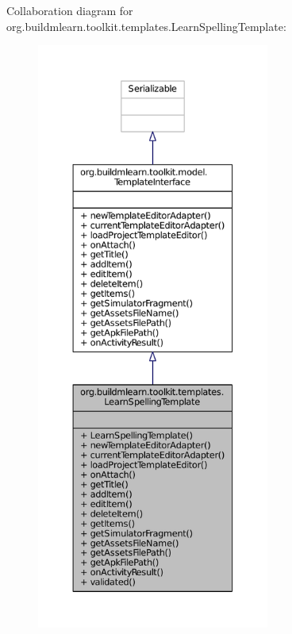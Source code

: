 Collaboration diagram for org.\-buildmlearn.\-toolkit.\-templates.\-Learn\-Spelling\-Template\-:
\nopagebreak
\begin{figure}[H]
\begin{center}
\leavevmode
\includegraphics[height=550pt]{d2/d14/classorg_1_1buildmlearn_1_1toolkit_1_1templates_1_1LearnSpellingTemplate__coll__graph}
\end{center}
\end{figure}

